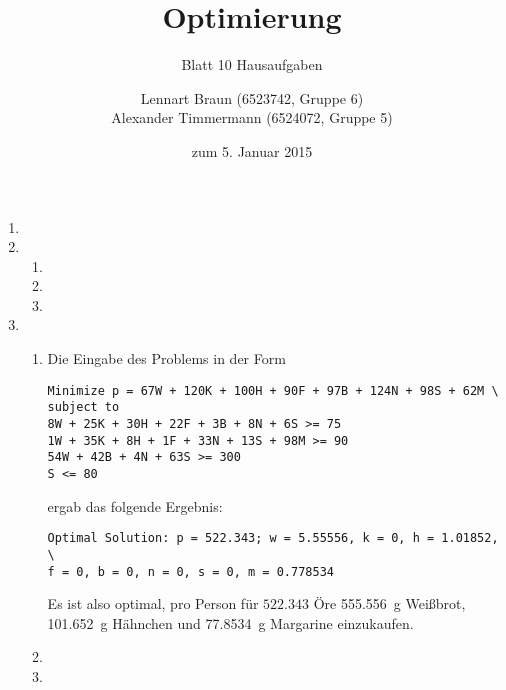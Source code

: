\documentclass[a4paper]{scrartcl}
\title{Optimierung}
\subtitle{Blatt 10 Hausaufgaben}
\author{
	Lennart Braun (6523742, Gruppe 6) \\
    Alexander Timmermann (6524072, Gruppe 5)
}
\date{zum 5. Januar 2015}
\begin{document}
\maketitle

\begin{enumerate}[label=\bfseries\arabic*.]
    \item

    \item
        \begin{enumerate}
            \item

            \item

            \item

        \end{enumerate}

    \item
        \begin{enumerate}
            \item
                Die Eingabe des Problems in der Form
                \begin{verbatim}
Minimize p = 67W + 120K + 100H + 90F + 97B + 124N + 98S + 62M \
subject to
8W + 25K + 30H + 22F + 3B + 8N + 6S >= 75
1W + 35K + 8H + 1F + 33N + 13S + 98M >= 90
54W + 42B + 4N + 63S >= 300
S <= 80 \end{verbatim}
                ergab das folgende Ergebnis:
                \begin{verbatim}
Optimal Solution: p = 522.343; w = 5.55556, k = 0, h = 1.01852, \
f = 0, b = 0, n = 0, s = 0, m = 0.778534 \end{verbatim}
                Es ist also optimal, pro Person für $522.343$ Öre
                \SI{555,556}{\gram} Weißbrot, \SI{101,652}{\gram} Hähnchen
                und \SI{77,8534}{\gram} Margarine einzukaufen.

            \item

            \item

        \end{enumerate}

\end{enumerate}
\end{document}
